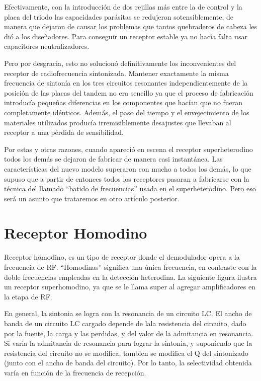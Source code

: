 \documentclass[letterpaper,10pt,spanish]{sphinxmanual}
\let\sphinxpxdimen\pdfpxdimen\else\newdimen\sphinxpxdimen
\begin{document}
Efectivamente, con la introducción de dos rejillas más entre la de control y la placa del triodo las capacidades parásitas se redujeron sotensiblemente, de manera que dejaron de causar los problemas que tantos quebraderos de cabeza les dió a los diseñadores. Para conseguir un receptor estable ya no hacía falta usar capacitores neutralizadores.

\sphinxincludegraphics[width=588\sphinxpxdimen,height=226\sphinxpxdimen]{{receprfs4low}.png}

Pero por desgracia, esto no solucionó definitivamente los inconvenientes del receptor de radiofrecuencia sintonizada. Mantener exactamente la misma frecuencia de sintonía en los tres circuitos resonantes independientemente de la posición de las placas del tandem no era sencillo ya que el proceso de fabricación introducía pequeñas diferencias en los componentes que hacían que no fueran completamente idénticos. Además, el paso del tiempo y el envejecimiento de los materiales utilizados producía
irremisiblemente desajustes que llevaban al receptor a una pérdida de sensibilidad.

Por estas y otras razones, cuando apareció en escena el receptor superheterodino todos los demás se dejaron de fabricar de manera casi instantánea. Las características del nuevo modelo superaron con mucho a todos los demás, lo que supuso que a partir de entonces todos los receptores pasaran a fabricarse con la técnica del llamado “batido de frecuencias” usada en el superheterodino. Pero eso será un asunto que trataremos en otro artículo posterior.


\chapter{Receptor Homodino}
\label{\detokenize{introduccion/sistemas:Receptor-Homodino}}
Receptor homodino, es un tipo de receptor donde el demodulador opera a la frecuencia de RF. “Homodinas” significa una única frecuencia, en contraste con la doble frecuencias empleadas en la detección heterodina. La siguiente figura ilustra un receptor super\sphinxhyphen{}homodino, ya que se le llama super al agregar amplificadores en la etapa de RF.

\sphinxincludegraphics[width=919\sphinxpxdimen,height=270\sphinxpxdimen]{{homodino}.png}

En general, la sintonia se logra con la resonancia de un circuito LC. El ancho de banda de un circuito LC cargado depende de lala resistencia del circuito, dado por la fuente, la carga y las perdidas, y del valor de la admitancia en resonancia. Si varia la admitancia de resonancia para lograr la sintonia, y suponiendo que la resistencia del circuito no se modifica, tambien se modifica el Q del sintonizado (junto con el ancho de banda del circuito). Por lo tanto, la selectividad obtenida varía en
función de la frecuencia de recepción.
\end{document}
